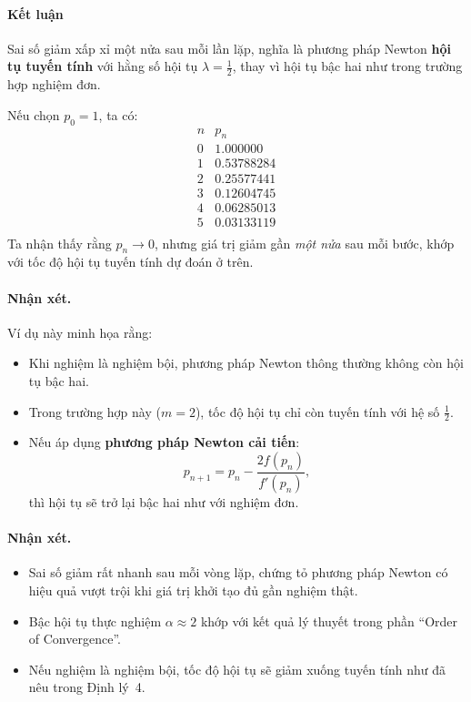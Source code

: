 \paragraph*{Kết luận}
Sai số giảm xấp xỉ một nửa sau mỗi lần lặp, nghĩa là phương pháp Newton 
\textbf{hội tụ tuyến tính} với hằng số hội tụ $\lambda = \tfrac{1}{2}$, thay vì hội tụ bậc hai như trong trường hợp nghiệm đơn.

Nếu chọn $p_0 = 1$, ta có:
\[
\begin{array}{c|c}
n & p_n \\ \hline
0 & 1.000000 \\
1 & 0.53788284 \\
2 & 0.25577441 \\
3 & 0.12604745 \\
4 & 0.06285013 \\
5 & 0.03133119 \\
\end{array}
\]
Ta nhận thấy rằng $p_n \to 0$, nhưng giá trị giảm gần \emph{một nửa} sau mỗi bước, 
khớp với tốc độ hội tụ tuyến tính dự đoán ở trên.

\paragraph*{Nhận xét.}
Ví dụ này minh họa rằng:
\begin{itemize}
    \item Khi nghiệm là nghiệm bội, phương pháp Newton thông thường không còn hội tụ bậc hai.
    \item Trong trường hợp này ($m = 2$), tốc độ hội tụ chỉ còn tuyến tính với hệ số $\tfrac{1}{2}$.
    \item Nếu áp dụng \textbf{phương pháp Newton cải tiến}:
    \[
        p_{n+1} = p_n - \frac{2 f(p_n)}{f'(p_n)},
    \]
    thì hội tụ sẽ trở lại bậc hai như với nghiệm đơn.
\end{itemize}

\paragraph*{Nhận xét.}
\begin{itemize}
    \item Sai số giảm rất nhanh sau mỗi vòng lặp, 
    chứng tỏ phương pháp Newton có hiệu quả vượt trội 
    khi giá trị khởi tạo đủ gần nghiệm thật.
    \item Bậc hội tụ thực nghiệm $\alpha \approx 2$ khớp với 
    kết quả lý thuyết trong phần “Order of Convergence”.
    \item Nếu nghiệm là nghiệm bội, tốc độ hội tụ sẽ giảm 
    xuống tuyến tính như đã nêu trong Định lý~4.
\end{itemize}

